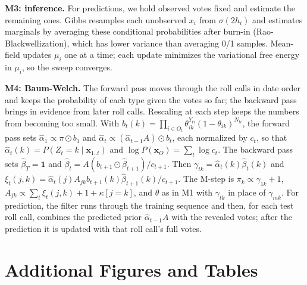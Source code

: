 \documentclass[10pt]{article}
\begin{document}
\textbf{M3: inference.} For predictions, we hold observed votes fixed and estimate the remaining ones. Gibbs resamples each unobserved $x_i$ from $\sigma(2h_i)$ and estimates marginals by
averaging these conditional probabilities after burn-in (Rao-Blackwellization), which has lower variance than
averaging 0/1 samples. Mean-field updates $\mu_i$ one at a time; each update minimizes the variational free energy
in $\mu_i$, so the sweep converges.

\textbf{M4: Baum-Welch.} The forward pass moves through the roll calls in date order and keeps the probability of each type given the votes so far; the backward pass brings in evidence from later roll calls. Rescaling at each step keeps the numbers from becoming too small. With $b_t(k)=\prod_{i\in O_t}\theta_{ik}^{Y_{ti}}(1-\theta_{ik})^{N_{ti}}$, the forward pass sets $\hat\alpha_1\propto\pi\odot b_1$ and $\hat\alpha_t\propto(\hat\alpha_{t-1}A)\odot b_t$, each normalized by $c_t$, so that $\hat\alpha_t(k)=P(Z_t{=}k\mid\mathbf x_{1..t})$ and $\log P(\mathbf x_O)=\sum_t\log c_t$. The backward pass sets $\hat\beta_T=\mathbf 1$ and $\hat\beta_t=A(b_{t+1}\odot\hat\beta_{t+1})/c_{t+1}$. Then $\gamma_{tk}=\hat\alpha_t(k)\hat\beta_t(k)$ and $\xi_t(j,k)=\hat\alpha_t(j)A_{jk}b_{t+1}(k)\hat\beta_{t+1}(k)/c_{t+1}$. The M-step is $\pi_k\propto\gamma_{1k}+1$, $A_{jk}\propto\sum_t\xi_t(j,k)+1+\kappa[j{=}k]$, and $\theta$ as in M1 with $\gamma_{tk}$ in place of $\gamma_{mk}$. For prediction, the filter runs through the training sequence and then, for each test roll call, combines the predicted prior $\hat\alpha_{t-1}A$ with the revealed votes; after the prediction it is updated with that roll call's full votes.

\section{Additional Figures and Tables}
\end{document}
